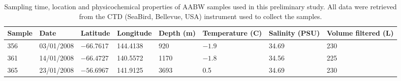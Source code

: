 \begin{table}
\sffamily
\footnotesize
\caption[\ac{AABW} samples used in the preliminary analysis]{Sampling time, location and physicochemical properties of \ac{AABW} samples used in this preliminary study.
All data were retrieved from the \ac{CTD} (SeaBird, Bellevue, USA) instrument used to collect the samples.}
\label{tab:deepsamples}
\begin{tabularx}{\textwidth}{llllXXXX}
\toprule
\textbf{Sample} & \textbf{Date} & \textbf{Latitude} & \textbf{Longitude} & \textbf{Depth (m)} & \textbf{Temperature (\textdegree{}C)} & \textbf{Salinity (PSU)} & \textbf{Volume \linebreak filtered (L)}\\
\midrule
356 & 03/01/2008 & $-66.7617$ & 144.4138 & 920 & $-1.9$ & 34.69 & 230\\
361 & 14/01/2008 & $-66.4727$ & 140.5572 & 1170 & $-1.8$ & 34.56 & 225\\
365 & 23/01/2008 & $-56.6967$ & 141.9125 & 3693 & 0.5 & 34.69 & 230\\
\bottomrule
\end{tabularx}
\end{table}

